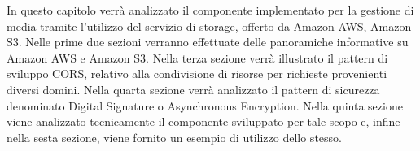 In questo capitolo verrà analizzato il componente implementato per la gestione di media tramite l'utilizzo del servizio di storage, offerto da Amazon AWS, Amazon S3.
Nelle prime due sezioni verranno effettuate delle panoramiche informative su Amazon AWS e Amazon S3. Nella terza sezione verrà illustrato il pattern di sviluppo CORS, relativo alla condivisione di risorse per richieste provenienti diversi domini. Nella quarta sezione verrà analizzato il pattern di sicurezza denominato Digital Signature o Asynchronous Encryption. Nella quinta sezione viene analizzato tecnicamente il componente sviluppato per tale scopo e, infine nella sesta sezione, viene fornito un esempio di utilizzo dello stesso.